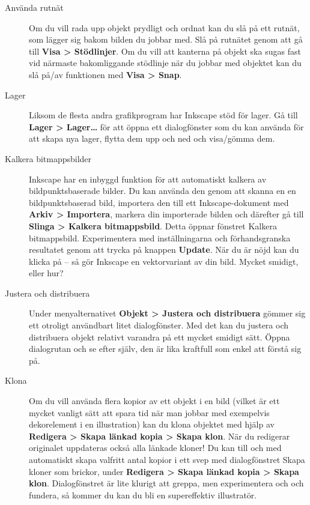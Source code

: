 \documentclass[a4paper,final]{memoir} %
\begin{document}
\begin{description}

\item[Använda rutnät] Om du vill rada upp objekt prydligt och ordnat kan du slå på ett rutnät, som lägger sig bakom bilden du jobbar med. Slå på rutnätet genom att gå till \textbf{Visa \textgreater{} Stödlinjer}. Om du vill att kanterna på objekt ska sugas fast vid närmaste bakomliggande stödlinje när du jobbar med objektet kan du slå på/av funktionen med \textbf{Visa \textgreater{} Snap}.

\item[Lager] Liksom de flesta andra grafikprogram har Inkscape stöd för lager. Gå till \textbf{Lager \textgreater{} Lager\ldots{}} för att öppna ett dialogfönster som du kan använda för att skapa nya lager, flytta dem upp och ned och visa/gömma dem.

\item[Kalkera bitmappsbilder] Inkscape har en inbyggd funktion för att automatiskt kalkera av bildpunktsbaserade bilder. Du kan använda den genom att skanna en en bildpunktsbaserad bild, importera den till ett Inkscape-dokument med \textbf{Arkiv \textgreater{} Importera}, markera din importerade bilden och därefter gå till \textbf{Slinga \textgreater{} Kalkera bitmappsbild}. Detta öppnar fönstret Kalkera bitmappsbild. Experimentera med inställningarna och förhandsgranska resultatet genom att trycka på knappen \textbf{Update}. När du är nöjd kan du klicka på \xok{} -- så gör Inkscape en vektorvariant av din bild. Mycket smidigt, eller hur?

\item[Justera och distribuera] Under menyalternativet \textbf{Objekt \textgreater{} Justera och distribuera} gömmer sig ett otroligt användbart litet dialogfönster. Med det kan du justera och distribuera objekt relativt varandra på ett mycket smidigt sätt. Öppna dialogrutan och se efter själv, den är lika kraftfull som enkel att förstå sig på.

\item[Klona] Om du vill använda flera kopior av ett objekt i en bild (vilket är ett mycket vanligt sätt att spara tid när man jobbar med exempelvis dekorelement i en illustration) kan du klona objektet med hjälp av \textbf{Redigera \textgreater{} Skapa länkad kopia \textgreater{} Skapa klon}. När du redigerar originalet uppdateras också alla länkade kloner! Du kan till och med automatiskt skapa valfritt antal kopior i ett svep med dialogfönstret Skapa kloner som brickor, under \textbf{Redigera \textgreater{} Skapa länkad kopia \textgreater{} Skapa klon}. Dialogfönstret är lite klurigt att greppa, men experimentera och och fundera, så kommer du kan du bli en supereffektiv illustratör.


\end{description}
\end{document}
